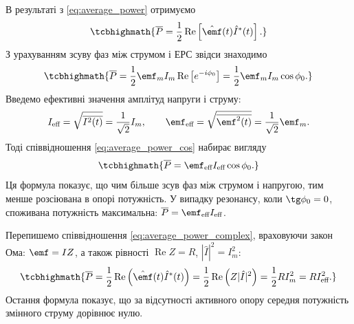 В результаті з \eqref{eq:average_power} отримуємо
\begin{equation}\label{eq:average_power_complex}
	\tcbhighmath{
		\overline{P} = \frac{1}{2}\operatorname{Re}\left[\hat{\emf}(t)\hat{I}^*(t)\right].
	}
\end{equation}
З урахуванням зсуву фаз між струмом і ЕРС звідси знаходимо
\begin{equation}\label{eq:average_power_cos}
	\tcbhighmath{
		\overline{P} = \frac{1}{2}\emf_m I_m \operatorname{Re}\left[e^{-i\phi_0}\right]
		= \frac{1}{2}\emf_m I_m \cos\phi_0.
	}
\end{equation}
Введемо ефективні значення амплітуд напруги і струму:
\begin{equation}\label{eq:effective_values}
	I_{\text{eff}} = \sqrt{\overline{I^2(t)}} = \frac{1}{\sqrt{2}}I_m, \qquad
	\emf_{\text{eff}} = \sqrt{\overline{\emf^2(t)}} = \frac{1}{\sqrt{2}}\emf_m.
\end{equation}
Тоді співвідношення \eqref{eq:average_power_cos} набирає вигляду
\begin{equation}\label{eq:average_power_effective}
	\tcbhighmath{
		\overline{P} = \emf_{\text{eff}} I_{\text{eff}} \cos\phi_0.
	}
\end{equation}
Ця формула показує, що чим більше зсув фаз між струмом і напругою, тим менше розсіювана в опорі потужність. У
випадку резонансу, коли $\tg\phi_0 = 0$, споживана потужність максимальна: $\overline{P} = \emf_{\text{eff}} I_{\text{eff}}$.

Перепишемо співвідношення \eqref{eq:average_power_complex}, враховуючи закон Ома: $\emf = IZ$, а
також рівності $\operatorname{Re} Z = R$, $|\hat{I}|^2 = I_m^2$:
\begin{equation}\label{eq:average_power_resistance}
	\tcbhighmath{
		\overline{P} = \frac{1}{2}\operatorname{Re}\left(\hat{\emf}(t)\hat{I}^*(t)\right)
		= \frac{1}{2}\operatorname{Re}\left(Z|\hat{I}|^2\right)
		= \frac{1}{2}RI_m^2 = RI_{\text{eff}}^2.
	}
\end{equation}
Остання формула показує, що за відсутності активного опору середня потужність змінного струму дорівнює нулю.


